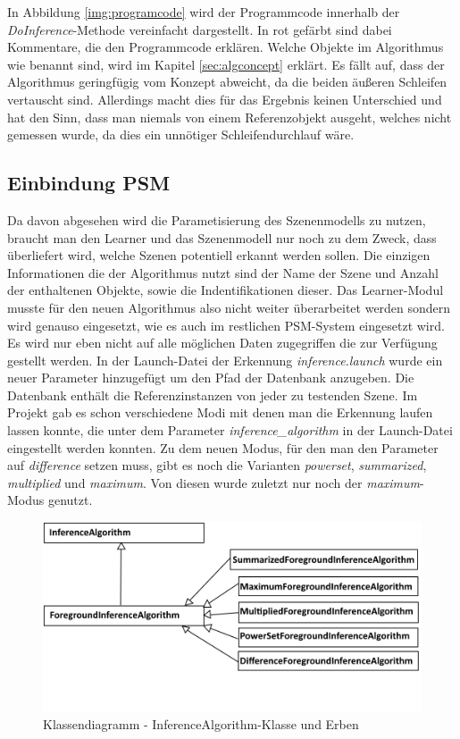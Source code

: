 In Abbildung \ref{img:programcode} wird der Programmcode innerhalb der \textit{DoInference}-Methode vereinfacht dargestellt. In rot gefärbt sind dabei Kommentare, die den Programmcode erklären. Welche Objekte im Algorithmus wie benannt sind, wird im Kapitel \ref{sec:algconcept} erklärt. Es fällt auf, dass der Algorithmus geringfügig vom Konzept abweicht, da die beiden äußeren Schleifen vertauscht sind. Allerdings macht dies für das Ergebnis keinen Unterschied und hat den Sinn, dass man niemals von einem Referenzobjekt ausgeht, welches nicht gemessen wurde, da dies ein unnötiger Schleifendurchlauf wäre.
\subsection{Einbindung PSM}
Da davon abgesehen wird die Parametisierung des Szenenmodells zu nutzen, braucht man den Learner und das Szenenmodell nur noch zu dem Zweck, dass überliefert wird, welche Szenen potentiell erkannt werden sollen. Die einzigen Informationen die der Algorithmus nutzt sind der Name der Szene und Anzahl der enthaltenen Objekte, sowie die Indentifikationen dieser. Das Learner-Modul musste für den neuen Algorithmus also nicht weiter überarbeitet werden sondern wird genauso eingesetzt, wie es auch im restlichen PSM-System eingesetzt wird. Es wird nur eben nicht auf alle möglichen Daten zugegriffen die zur Verfügung gestellt werden.
In der Launch-Datei der Erkennung \textit{inference.launch} wurde ein neuer Parameter hinzugefügt um den Pfad der Datenbank anzugeben. Die Datenbank enthält die Referenzinstanzen von jeder zu testenden Szene. Im Projekt gab es schon verschiedene Modi mit denen man die Erkennung laufen lassen konnte, die unter dem Parameter \textit{inference\_algorithm} in der Launch-Datei eingestellt werden konnten. Zu dem neuen Modus, für den man den Parameter auf \textit{difference} setzen muss, gibt es noch die Varianten \textit{powerset}, \textit{summarized}, \textit{multiplied} und \textit{maximum}. Von diesen wurde zuletzt nur noch der \textit{maximum}-Modus genutzt.\smallskip\\
\begin{figure}
	\centering
	\includegraphics[width=14cm]{bilder/inferenceAlgorithm.pdf}
	\caption{Klassendiagramm - InferenceAlgorithm-Klasse und Erben}
	\label{img:vererbung}
\end{figure}
